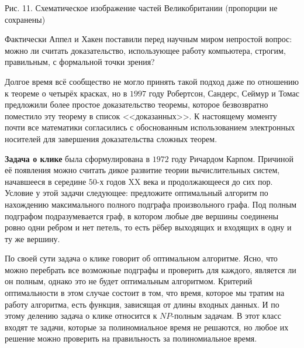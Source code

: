 \begin{paracol}{2}
\begin{center}\small Рис. 11. Схематическое изображение частей Великобритании (пропорции не сохранены)\end{center}
\end{paracol}

	Фактически Аппел и Хакен поставили перед научным миром непростой вопрос: можно ли считать доказательство, использующее работу компьютера, строгим, правильным, с формальной точки зрения? 
	
	Долгое время всё сообщество не могло принять такой подход даже по отношению к теореме о четырёх красках, но в $1997$ году Робертсон, Сандерс, Сеймур и Томас предложили более простое доказательство теоремы, которое безвозвратно поместило эту теорему в список <<доказанных>>. К настоящему моменту почти все математики согласились с обоснованным использованием электронных носителей для завершения доказательства сложных теорем.
	
	\textbf{Задача о клике} была сформулирована в $1972$ году Ричардом Карпом. Причиной её появления можно считать дикое развитие теории вычислительных систем, начавшееся в середине $50$-х годов XX века и продолжающееся до сих пор. Условие у этой задачи следующее: предложите оптимальный алгоритм по нахождению максимального полного подграфа произвольного графа. Под полным подграфом подразумевается граф, в котором любые две вершины соединены ровно одни ребром и нет петель, то есть рёбер выходящих и входящих в одну и ту же вершину.
	
	По своей сути задача о клике говорит об оптимальном алгоритме. Ясно, что можно перебрать все возможные подграфы и проверить для каждого, является ли он полным, однако это не будет оптимальным алгоритмом. Критерий оптимальности в этом случае состоит в том, что время, которое мы тратим на работу алгоритма, есть функция, зависящая от длины входных данных. И по этому делению задача о клике относится к $NP$-полным задачам. В этот класс входят те задачи, которые за полиномиальное время не решаются, но любое их решение можно проверить на правильность за полиномиальное время.
	
